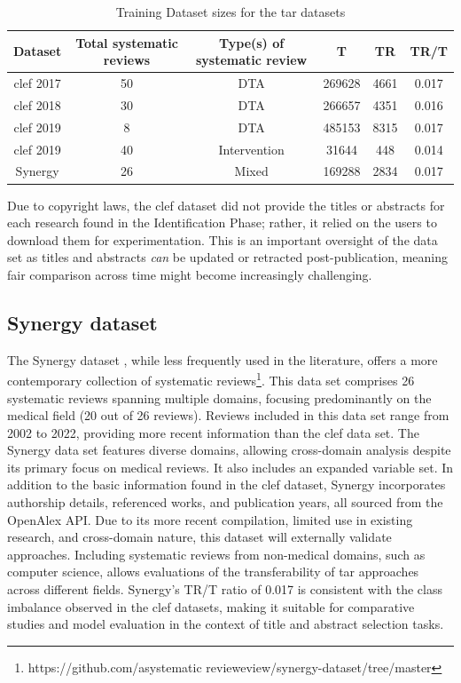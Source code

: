 \documentclass[10pt,oneside]{book}
\begin{document}
\begin{table}
    \centering
    \begin{tabular}{|c|c|c|c|c|c|}
    \hline
        Dataset & Total systematic reviews & Type(s) of systematic review & T & TR & TR/T\\   \hline
       \gls*{clef} 2017 & 50 & DTA & 269628 & 4661  & 0.017 \\   \hline
        \gls*{clef} 2018 & 30 & DTA & 266657 & 4351 & 0.016\\   \hline
        \gls*{clef}   2019 & 8 & DTA & 485153 & 8315 & 0.017\\   \hline
       \gls*{clef}  2019 & 40 & Intervention & 31644 &  448 & 0.014 \\   \hline
        Synergy & 26 & Mixed & 169288 &  2834 & 0.017 \\   \hline
    \end{tabular}
    \caption{Training Dataset sizes for the \gls*{tar} datasets}
    \label{tab:training_dataset_clef}
\end{table}

Due to copyright laws, the \gls*{clef} dataset did not provide the titles or abstracts for each research found in the Identification Phase; rather, it relied on the users to download them for experimentation. This is an important oversight of the data set as titles and abstracts \emph{can} be updated or retracted post-publication, meaning fair comparison across time might become increasingly challenging.


\subsection{Synergy dataset}
The Synergy dataset \cite{de_bruin_synergy_2023}, while less frequently used in the literature, offers a more contemporary collection of systematic reviews\footnote{https://github.com/asystematic revieweview/synergy-dataset/tree/master}. This data set comprises 26 systematic reviews spanning multiple domains, focusing predominantly on the medical field (20 out of 26 reviews). Reviews included in this data set range from 2002 to 2022, providing more recent information than the \gls*{clef} data set.
The Synergy data set features diverse domains, allowing cross-domain analysis despite its primary focus on medical reviews. It also includes an expanded variable set. In addition to the basic information found in the \gls*{clef} dataset, Synergy incorporates authorship details, referenced works, and publication years, all sourced from the OpenAlex API.
Due to its more recent compilation, limited use in existing research, and cross-domain nature, this dataset will externally validate approaches. Including systematic reviews from non-medical domains, such as computer science, allows evaluations of the transferability of \gls*{tar} approaches across different fields. Synergy's TR/T ratio of 0.017 is consistent with the class imbalance observed in the \gls*{clef} datasets, making it suitable for comparative studies and model evaluation in the context of title and abstract selection tasks.
\end{document}
